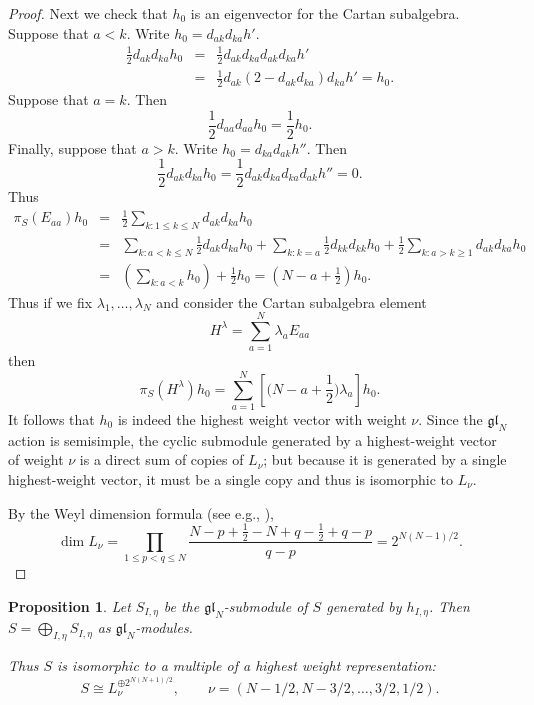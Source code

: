 \documentclass[11pt]{article}
\newtheorem{proposition}{Proposition}
\newcommand{\myd}{d}
\begin{document}
\begin{proof}
Next we check that $h_0$ is an eigenvector for the Cartan subalgebra. Suppose that $a<k$.  
Write $h_0 = \myd_{ak}\myd_{ka}h'$.  
\begin{eqnarray*}
    \frac{1}{2}\myd_{ak}\myd_{ka} h_0 &=& \frac{1}{2}\myd_{ak}\myd_{ka}   \myd_{ak}\myd_{ka}h' \\ &=& \frac{1}{2}\myd_{ak} (2 - \myd_{ak}\myd_{ka}) \myd_{ka} h' = h_0.
\end{eqnarray*}
Suppose that $a= k$. Then $$\frac{1}{2} \myd_{aa}\myd_{aa} h_0 
= \frac{1}{2} h_0.$$
Finally, suppose that $a>k$. Write 
$h_0 = \myd_{ka}\myd_{ak} h''$.  Then
$$ \frac{1}{2}\myd_{ak}\myd_{ka} h_0=  \frac{1}{2}\myd_{ak}\myd_{ka} \myd_{ka}\myd_{ak} h''=0.$$
Thus
\begin{eqnarray*}
\pi_S(E_{aa})h_0 &=& \frac{1}{2} \sum_{k:1\leq k\leq N} \myd_{ak} \myd_{ka} h_0 
\\ &=& \sum_{k:a<k\leq N} \frac{1}{2} \myd_{ak} \myd_{ka} h_0  
+ \sum_{k:k=a}\frac{1}{2}\myd_{kk}\myd_{kk} h_0 + \frac{1}{2}\sum_{k:a>k\geq 1} \myd_{ak} \myd_{ka} h_0 \\
&=& \left(\sum_{k:a<k}  h_0\right) + \frac{1}{2}h_0 
= (N-a+\frac{1}{2}) h_0. 
\end{eqnarray*}
Thus if we fix $\lambda_1,\dots,\lambda_N$ and consider the Cartan subalgebra element $$H^\lambda =\sum_{a=1}^N \lambda_a E_{aa}  $$ then $$\pi_S(H^\lambda) h_0 = \sum_{a=1}^N 
\left[\bigl(N-a+\frac{1}{2}\bigr)\lambda_a  \right] h_0.$$ 
It follows that $h_0$ is indeed the highest weight vector with weight $\nu$. 
Since the $\mathfrak{gl}_N$ action is semisimple, the cyclic submodule generated by a highest-weight vector of weight $\nu$ is a direct sum of copies of $L_\nu$; but because it is generated by a single highest-weight vector, it must be a single copy and thus is isomorphic to $L_\nu$. 


By the Weyl dimension formula (see e.g., \cite[\S7.1, Theorem 7.1.9]{GoodmanWallach}), $$\dim L_\nu = \prod_{1\leq p<q\leq N} \frac{N-p+\frac{1}{2} - N+q -\frac{1}{2} +q-p }{q-p} =2^{N(N-1)/2}.$$ 
\end{proof}
\begin{proposition} \label{prop:decompositionOfS}
    Let $S_{I,\eta}$ be the $\mathfrak{gl}_N$-submodule of $S$ generated by $h_{I,\eta}$.  Then $S=\bigoplus_{I,\eta} S_{I,\eta}$ as $\mathfrak{gl}_N$-modules. 
    
    Thus $S$ is isomorphic to a multiple of a highest weight representation: $$S\cong L^{\oplus 2^{N(N+1)/2} }_\nu,\qquad \nu = (N-1/2,N-3/2,\dots,3/2,1/2).$$
\end{proposition}
\end{document}
